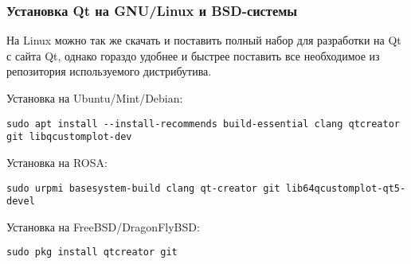 \subsubsection{Установка Qt на GNU/Linux и BSD-системы}
На Linux можно так же скачать и поставить полный набор для разработки на Qt с сайта Qt, однако гораздо удобнее и быстрее поставить все необходимое из репозитория используемого дистрибутива.

Установка на Ubuntu/Mint/Debian:
\begin{verbatim}
sudo apt install --install-recommends build-essential clang qtcreator git libqcustomplot-dev
\end{verbatim}

Установка на ROSA:
\begin{verbatim}
sudo urpmi basesystem-build clang qt-creator git lib64qcustomplot-qt5-devel
\end{verbatim}

Установка на FreeBSD/DragonFlyBSD:
\begin{verbatim}
sudo pkg install qtcreator git
\end{verbatim}

\clearpage
